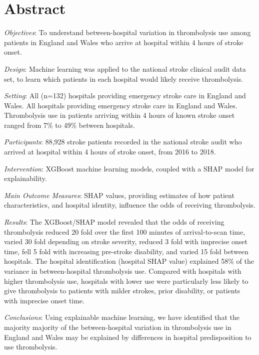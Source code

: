 \section*{Abstract}

\emph{Objectives}: To understand between-hospital variation in thrombolysis use among patients in England and Wales who arrive at hospital within 4 hours of stroke onset.

\emph{Design}: Machine learning was applied to the national stroke clinical audit data set, to learn which patients in each hospital would likely receive thrombolysis.

\emph{Setting}: All (n=132) hospitals providing emergency stroke care in England and Wales. All hospitals providing emergency stroke care in England and Wales. Thrombolysis use in patients arriving within 4 hours of known stroke onset ranged from 7\% to 49\% between hospitals.

\emph{Participants}: 88,928 stroke patients recorded in the national stroke audit who arrived at hospital within 4 hours of stroke onset, from 2016 to 2018.

\emph{Intervention}: XGBoost machine learning models, coupled with a SHAP model for explainability.

\emph{Main Outcome Measures}: SHAP values, providing estimates of how patient characteristics, and hospital identity, influence the odds of receiving thrombolysis.

\emph{Results}: The XGBoost/SHAP model revealed that the odds of receiving thrombolysis reduced 20 fold over the first 100 minutes of arrival-to-scan time, varied 30 fold depending on stroke severity, reduced 3 fold with imprecise onset time, fell 5 fold with increasing pre-stroke disability, and varied 15 fold between hospitals. The hospital identification (hospital SHAP value) explained 58\% of the variance in between-hospital thrombolysis use. Compared with hospitals with higher thrombolysis use, hospitals with lower use were particularly less likely to give thrombolysis to patients with milder strokes, prior disability, or patients with imprecise onset time.

\emph{Conclusions}: Using explainable machine learning, we have identified that the majority majority of the between-hospital variation in thrombolysis use in England and Wales may be explained by differences in hospital predisposition to use thrombolysis.